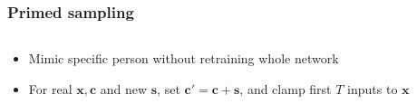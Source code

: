 \documentclass[10pt,xcolor=dvipsnames]{beamer}
\def\bfs{\mathbf{s}}
\def\bfc{\mathbf{c}}
\def\bfx{\mathbf{x}}
\begin{document}
\begin{frame}
  \frametitle{Primed sampling}
 \begin{columns}
   \begin{column}{.5\textwidth}
   \end{column}

   \begin{column}{.5\textwidth}
   \end{column}
 \end{columns} 
 \begin{itemize}
 \item Mimic specific person without retraining whole network
 \item For real $\bfx, \bfc$ and new $\bfs$,
   set $\bfc' = \bfc + \bfs$, and clamp first $T$ inputs to $\bfx$
 \end{itemize}
\end{frame}
\end{document}
